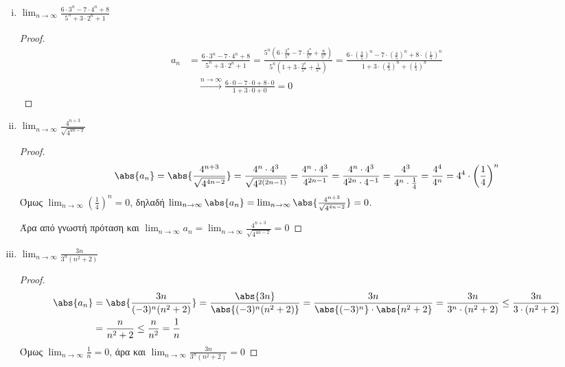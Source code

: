 \begin{enumerate}
\begin{enumerate}[i)]
        \item $ \lim_{n \to \infty} \frac{6\cdot 3^{n}-7 \cdot 4^{n}+8}
          {5^{n}+3\cdot 2^{n}+1} $ 
          \begin{proof}
            \begin{align*}
              a_{n} 
                        &= \frac{6\cdot 3^{n}-7 \cdot 4^{n}+8} {5^{n}+3
                        \cdot 2^{n}+1} = 
                        \frac{5^{n}\left(6\cdot \frac{3^{n}}{5^{n}}  - 7 \cdot 
                            \frac{4^{n}}{5^{n}} + 
                            \frac{8}{5^{n}}\right)}{5^{n}\left(1 + 3 
                        \cdot \frac{2^{n}}{5^{n}} + \frac{1}{5^{n}}\right)} = 
                        \frac{6\cdot (\frac{3}{5} )^{n}-7\cdot (\frac{4}{5} )^{n} +8
                          \cdot ( \frac{1}{5} )^{n}}{1 + 3\cdot (\frac{2}{5} )^{n}+ 
                        (\frac{1}{5} )^{n}} \\
                        & \quad \xrightarrow{n \to \infty}  
                        \frac{6 \cdot 0 -7 \cdot 0 + 8 \cdot 0}{1 + 3 \cdot 0 + 0} = 0  
            \end{align*} 
          \end{proof}


        \item $ \lim_{n \to \infty} \frac{4^{n+3}}{\sqrt{4^{4n-2}}} $ 
          \begin{proof}
            \[
              \abs{a_{n}} = \abs{\frac{4^{n+3}}{\sqrt{4^{4n-2}}}} = 
              \frac{4^{n}\cdot 4^{3}}{\sqrt{4^{2(2n-1)}}} = 
              \frac{4^{n} \cdot 4^{3}}{4^{2n-1}} = 
              \frac{4^{n}\cdot 4^{3}}{4^{2n}\cdot 4^{-1}} = 
              \frac{4^{3}}{4^{n}\cdot 
              \frac{1}{4}} = \frac{4^{4}}{4^{n}} = 4^{4}\cdot 
              \left(\frac{1}{4} \right) ^{n}
            \] 
            Όμως $ \lim_{n \to \infty} \left(\frac{1}{4}\right)^{n} = 0  $, 
            δηλαδή $ \lim_{n \to \infty} \abs{a_{n}} = \lim_{n \to \infty}
            \abs{\frac{4^{n+3}}{\sqrt{4^{4n-2}}}} = 0 $. 

            Άρα από γνωστή πρόταση και
            $ \lim_{n \to \infty} a_{n} =  \lim_{n \to \infty} 
            \frac{4^{n+3}}{\sqrt{4^{4n-2}}} = 0 $ 
          \end{proof}

        \item $ \lim_{n \to \infty} \frac{3n}{3^{n}(n^{2}+2)} $ 
          \begin{proof}
            \begin{align*}
              \abs{a_{n}} 
               &= \abs{\frac{3n}{(-3)^{n}(n^{2}+2)}} =
               \frac{\abs{3n}}{\abs{(-3)^{n}(n^{2}+2)}} = \frac{3n}{\abs{(-3)^{n}} \cdot
               \abs{n^{2}+2} } = \frac{3n}{3^{n}\cdot (n^{2}+2)} \leq 
               \frac{3n}{3\cdot (n^{2}+2)} \\ 
               &= \frac{n}{n^{2}+2} \leq \frac{n}{n^{2}} = \frac{1}{n} 
            \end{align*} 
            Όμως $ \lim_{n \to \infty} \frac{1}{n} = 0 $, άρα και 
            $ \lim_{n \to \infty} \frac{3n}{3^{n}(n^{2}+2)} = 0 $
          \end{proof}


\end{enumerate}
\end{enumerate}

